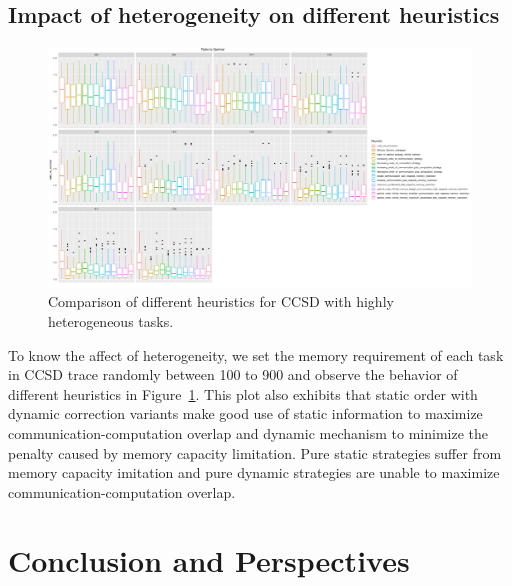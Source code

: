 \documentclass[runningheads]{llncs} %
\begin{document}
\subsection{Impact of heterogeneity on different heuristics}
	\begin{figure}[htb]
	\includegraphics[scale=0.3]{../ExperimentalResults/ccsd-random/ratio_to_optimal_ccsd_random.pdf}
	\caption{Comparison of different heuristics for CCSD with highly heterogeneous tasks.}
	\label{fig:ratio_to_optimal_ccsd_random}
	\end{figure}	


To know the affect of heterogeneity, we set the memory requirement of each task in CCSD trace randomly between 100 to 900 and observe the behavior of different heuristics in  Figure~\ref{fig:ratio_to_optimal_ccsd_random}. This plot also exhibits that static order with dynamic correction variants make good use of static information to maximize communication-computation overlap and dynamic mechanism to minimize the penalty caused by memory capacity limitation. Pure static strategies suffer from memory capacity imitation and pure dynamic strategies are unable to maximize communication-computation overlap.



\section{Conclusion and Perspectives}
\label{sec:conclusion}


\end{document}
